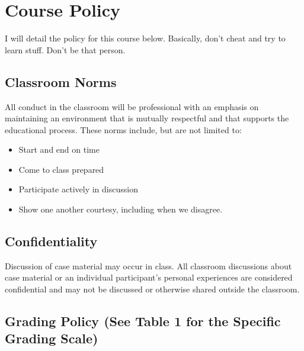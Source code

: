 \documentclass[11pt,]{article}
\providecommand{\tightlist}{%
  \setlength{\itemsep}{0pt}\setlength{\parskip}{0pt}}
\begin{document}
\section{Course Policy}\label{course-policy}

I will detail the policy for this course below. Basically, don't cheat
and try to learn stuff. Don't be that person.

\subsection{Classroom Norms}\label{classroom-norms}

All conduct in the classroom will be professional with an emphasis on
maintaining an environment that is mutually respectful and that supports
the educational process. These norms include, but are not limited to:

\begin{itemize}
\tightlist
\item
  Start and end on time
\item
  Come to class prepared
\item
  Participate actively in discussion
\item
  Show one another courtesy, including when we disagree.
\end{itemize}

\subsection{Confidentiality}\label{confidentiality}

Discussion of case material may occur in class. All classroom
discussions about case material or an individual participant's personal
experiences are considered confidential and may not be discussed or
otherwise shared outside the classroom.

\subsection{Grading Policy (See Table 1 for the Specific Grading
Scale)}\label{grading-policy-see-table-1-for-the-specific-grading-scale}
\end{document}
